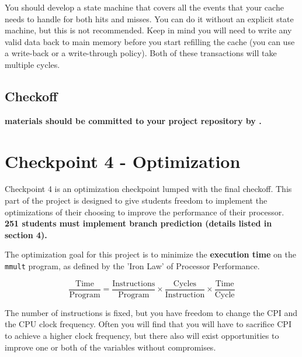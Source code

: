 \documentclass[11pt]{article}
\begin{document}

You should develop a state machine that covers all the events that your cache needs to handle for both hits and misses. You can do it without an explicit state machine, but this is not recommended. Keep in mind you will need to write any valid data back to main memory before you start refilling the cache (you can use a write-back or a write-through policy). Both of these transactions will take multiple cycles.


\subsection{Checkoff}
\textbf{\cacheTaskName \space materials should be committed to your project repository by \cacheDueDate.}


\newpage
\section{Checkpoint 4 - Optimization}

Checkpoint 4 is an optimization checkpoint lumped with the final checkoff.
This part of the project is designed to give students freedom to implement the optimizations of their choosing to improve the performance of their processor.
\textbf{251 students must implement branch prediction (details listed in section 4).}

The optimization goal for this project is to minimize the \textbf{execution time} on the \verb|mmult| program, as defined by the 'Iron Law' of Processor Performance.

\begin{equation*}
\frac{\text{Time}}{\text{Program}} = \frac{\text{Instructions}}{\text{Program}} \times \frac{\text{Cycles}}{\text{Instruction}} \times \frac{\text{Time}}{\text{Cycle}}
\end{equation*}

The number of instructions is fixed, but you have freedom to change the CPI and the CPU clock frequency.
Often you will find that you will have to sacrifice CPI to achieve a higher clock frequency, but there also will exist opportunities to improve one or both of the variables without compromises.
\end{document}
